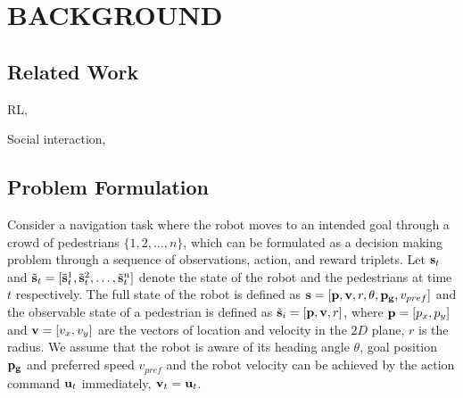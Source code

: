 \documentclass[letterpaper, 10 pt, conference]{ieeeconf}  %
\begin{document}
\section{BACKGROUND} \label{sec:background} 

\subsection{Related Work}

RL, 
\vspace{2cm}

Social interaction, 
\vspace{2cm}

\subsection{Problem Formulation}

Consider a navigation task where the robot moves to an intended goal through a crowd of pedestrians $\{1,2,\dots,n\}$, which can be formulated as a decision making problem through a sequence of observations, action, and reward triplets\cite{chen_decentralized_2016,chen_socially_2017,everett_motion_2018}. Let $\bold{s}_t $ and $\tilde{\bold{s}}_t = [\tilde{\bold{s}}_t^1, \tilde{\bold{s}}_t^2, \dots, \tilde{\bold{s}}_t^n]$ denote the state of the robot and the pedestrians at time $t$ respectively. The full state of the robot is defined as $ \bold{s} = [\bold{p}, \bold{v}, r, \theta, \bold{p_g}, v_{pref}]$ and the observable state of a pedestrian is defined as $ \tilde{\bold{s}}_i = [\bold{p}, \bold{v}, r]$, where $\bold{p}=[p_x,p_y]$ and $\bold{v}=[v_x,v_y]$ are the vectors of location and velocity in the $2D$ plane, $r$ is the radius. We assume that the robot is aware of its heading angle $\theta$, goal position $\bold{p_g}$ and preferred speed $v_{pref}$ and the robot velocity can be achieved by the action command $\bold{u}_t$ immediately, $\bold{v}_t = \bold{u}_t$. 
\end{document}
